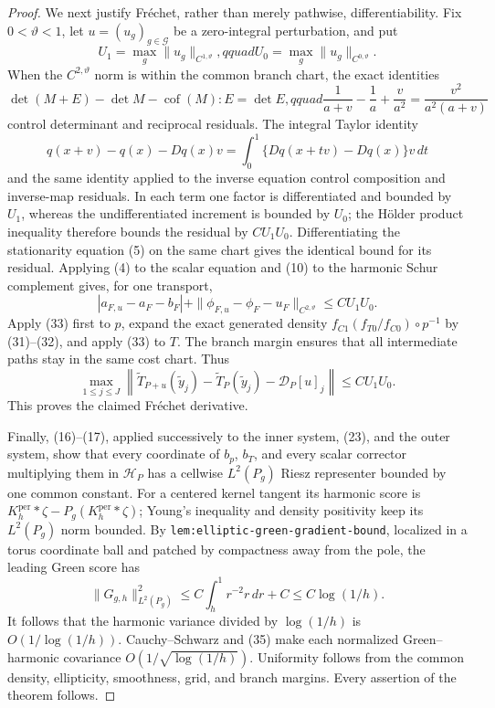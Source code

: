 \documentclass{article}
\begin{document}
\begin{proof}
We next justify Fr\'echet, rather than merely pathwise, differentiability.  Fix \(0<\vartheta<1\), let \(u=(u_g)_{g\in\mathcal G}\) be a zero-integral perturbation, and put
\[
 U_1=\max_g\|u_g\|_{C^{1,\vartheta}},qquad
 U_0=\max_g\|u_g\|_{C^{0,\vartheta}}.                                \tag{30}
\]
When the \(C^{2,\vartheta}\) norm is within the common branch chart, the exact identities
\[
 \det(M+E)-\det M-\operatorname{cof}(M):E=\det E,qquad
 \frac1{a+v}-\frac1a+\frac v{a^2}=\frac{v^2}{a^2(a+v)}                \tag{31}
\]
control determinant and reciprocal residuals.  The integral Taylor identity
\[
 q(x+v)-q(x)-Dq(x)v
 =\int_0^1\{Dq(x+tv)-Dq(x)\}v\,dt                                    \tag{32}
\]
and the same identity applied to the inverse equation control composition and inverse-map residuals.  In each term one factor is differentiated and bounded by \(U_1\), whereas the undifferentiated increment is bounded by \(U_0\); the H\"older product inequality therefore bounds the residual by \(CU_1U_0\).  Differentiating the stationarity equation (5) on the same chart gives the identical bound for its residual.  Applying (4) to the scalar equation and (10) to the harmonic Schur complement gives, for one transport,
\[
 |a_{F,u}-a_F-b_F|+
 \|\phi_{F,u}-\phi_F-u_F\|_{C^{2,\vartheta}}
 \leq CU_1U_0.                                                        \tag{33}
\]
Apply (33) first to \(p\), expand the exact generated density
\(f_{C1}(f_{T0}/f_{C0})\circ p^{-1}\) by (31)--(32), and apply (33) to \(T\).  The branch margin ensures that all intermediate paths stay in the same cost chart.  Thus
\[
 \max_{1\leq j\leq J}\left\|
 \widetilde T_{P+u}(\widetilde y_j)-\widetilde T_P(\widetilde y_j)
 -\mathcal D_P[u]_j\right\|\leq CU_1U_0.                              \tag{34}
\]
This proves the claimed Fr\'echet derivative.

Finally, (16)--(17), applied successively to the inner system, (23), and the outer system, show that every coordinate of \(b_p\), \(b_T\), and every scalar corrector multiplying them in \(\mathcal H_P\) has a cellwise \(L^2(P_g)\) Riesz representer bounded by one common constant.  For a centered kernel tangent its harmonic score is \(K_h^{\mathrm{per}}*\zeta-P_g(K_h^{\mathrm{per}}*\zeta)\); Young's inequality and density positivity keep its \(L^2(P_g)\) norm bounded.  By \texttt{lem:elliptic-green-gradient-bound}, localized in a torus coordinate ball and patched by compactness away from the pole, the leading Green score has
\[
 \|G_{g,h}\|_{L^2(P_g)}^2
 \leq C\int_h^1r^{-2}r\,dr+C\leq C\log(1/h).                          \tag{35}
\]
It follows that the harmonic variance divided by \(\log(1/h)\) is \(O(1/\log(1/h))\).  Cauchy--Schwarz and (35) make each normalized Green--harmonic covariance \(O(1/\sqrt{\log(1/h)})\).  Uniformity follows from the common density, ellipticity, smoothness, grid, and branch margins.  Every assertion of the theorem follows.
\end{proof}
\end{document}
